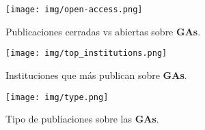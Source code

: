 \documentclass[12pt,letterpaper]{article}
\begin{document}
\begin{figure}[htp]
    \centering
    \texttt{[image: img/open-access.png]}
    \caption{Publicaciones cerradas vs abiertas sobre \textbf{GAs}.}
    \label{fig:openalex-closed}
\end{figure}

\begin{figure}[htp]
    \centering
    \texttt{[image: img/top\_institutions.png]}
    \caption{Instituciones que más publican sobre \textbf{GAs}.}
    \label{fig:openalex-institutions}
\end{figure}

\begin{figure}[htp]
    \centering
    \texttt{[image: img/type.png]}
    \caption{Tipo de publiaciones sobre las \textbf{GAs}.}
    \label{fig:openalex-type}
\end{figure}
\end{document}
